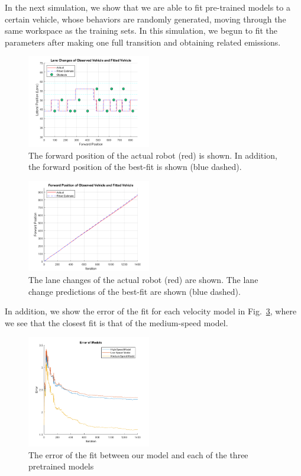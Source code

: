 \documentclass[letterpaper, 10 pt, conference]{ieeeconf}  %
\begin{document}
In the next simulation, we show that we are able to fit pre-trained models to a certain vehicle, whose behaviors are randomly generated, moving through the same workspace as the training sets. In this simulation, we begun to fit the parameters after making one full transition and obtaining related emissions. 

\begin{figure}[ht]
    \includegraphics[width=0.48\textwidth]{fit2.png}
    \caption{The forward position of the actual robot (red) is shown. In addition, the forward position of the best-fit is shown (blue dashed).}
    \label{fig:fwd}
\end{figure}

\begin{figure}[ht]
    \includegraphics[width=0.48\textwidth]{fit1.png}
    \caption{The lane changes of the actual robot (red) are shown. The lane change predictions of the best-fit are shown (blue dashed).}
    \label{fig:lanchan}
\end{figure}
 In addition, we show the error of the fit for each velocity model in Fig.~\ref{fig:error}, where we see that the closest fit is that of the medium-speed model.
 
 \begin{figure}[ht]
    \includegraphics[width=0.48\textwidth]{fit3.png}
    \caption{The error of the fit between our model and each of the three pretrained models}
    \label{fig:error}
\end{figure}
 
\end{document}
